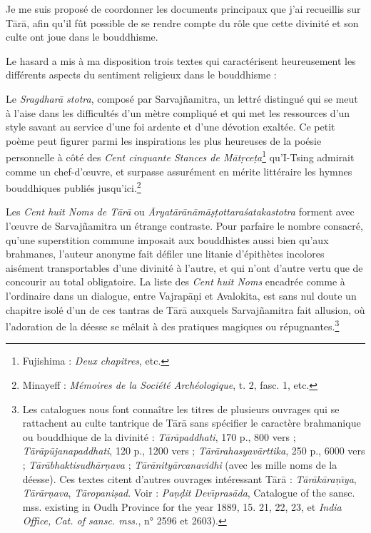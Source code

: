 \documentclass[a4paper, 11pt, oneside, french, landscape, twocolumn]{article}
\begin{document}
Je me suis proposé de coordonner les documents principaux que j'ai recueillis sur T\={a}r\={a}, afin qu'il fût possible de se rendre compte du rôle que cette divinité et son culte ont joue dans le bouddhisme.

Le hasard a mis à ma disposition trois textes qui caractérisent heureusement les différents aspects du sentiment religieux dans le bouddhisme :

Le \emph{Sragdhar\={a} stotra}, composé par Sarvaj\~{n}amitra, un lettré distingué qui se meut à l'aise dans les difficultés d'un mètre compliqué et qui met les ressources d'un style savant au service d'une foi ardente et d'une dévotion exaltée. Ce petit poème peut figurer parmi les inspirations les plus heureuses de la poésie personnelle à côté des \emph{Cent cinquante Stances de M\={a}t\d{r}ce\d{t}a}\footnote{Fujishima : \emph{Deux chapitres}, etc.} qu'I-Tsing admirait comme un chef-d'œuvre, et surpasse assurément en mérite littéraire les hymnes bouddhiques publiés jusqu'ici.\footnote{Minayeff : \emph{Mémoires de la Société Archéologique}, t. 2, fasc. 1, etc.}

Les \emph{Cent huit Noms de T\={a}r\={a}} ou \emph{\={A}ryat\={a}r\={a}n\={a}m\={a}\d{s}\d{t}ottara\'{s}atakastotra} forment avec l'œuvre de Sarvaj\~{n}amitra un étrange contraste. Pour parfaire le nombre consacré, qu'une superstition commune imposait aux bouddhistes aussi bien qu'aux brahmanes, l'auteur anonyme fait défiler une litanie d'épithètes incolores aisément transportables d'une divinité à l'autre, et qui n'ont d'autre vertu que de concourir au total obligatoire. La liste des \emph{Cent huit Noms} encadrée comme à l'ordinaire dans un dialogue, entre Vajrap\={a}\d{n}i et Avalokita, est sans nul doute un chapitre isolé d'un de ces tantras de T\={a}r\={a} auxquels Sarvaj\~{n}amitra fait allusion, où l'adoration de la déesse se mêlait à des pratiques magiques ou répugnantes.\footnote{Les catalogues nous font connaître les titres de plusieurs ouvrages qui se rattachent au culte tantrique de T\={a}r\={a} sans spécifier le caractère brahmanique ou bouddhique de la divinité : \emph{T\={a}r\={a}paddhati}, 170 p., 800 vers ; \emph{T\={a}r\={a}p\={u}janapaddhati}, 120 p., 1200 vers ; \emph{T\={a}r\={a}rahasyav\={a}rttika}, 250 p., 6000 vers ; \emph{T\={a}r\={a}bhaktisudh\={a}r\d{n}ava} ; \emph{T\={a}r\={a}nity\={a}rcanavidhi} (avec les mille noms de la déesse). Ces textes citent d'autres ouvrages intéressant T\={a}r\={a} : \emph{T\={a}r\={a}k\={a}ra\d{n}\={\i}ya}, \emph{T\={a}r\={a}r\d{n}ava}, \emph{T\={a}ropani\d{s}ad}. Voir : \emph{Pa\d{n}\d{d}it Dev\={\i}pras\={a}da}, Catalogue of the sansc. mss. existing in Oudh Province for the year 1889, 15. 21, 22, 23, et \emph{India Office, Cat. of sansc. mss.}, n° 2596 et 2603).}
\end{document}
